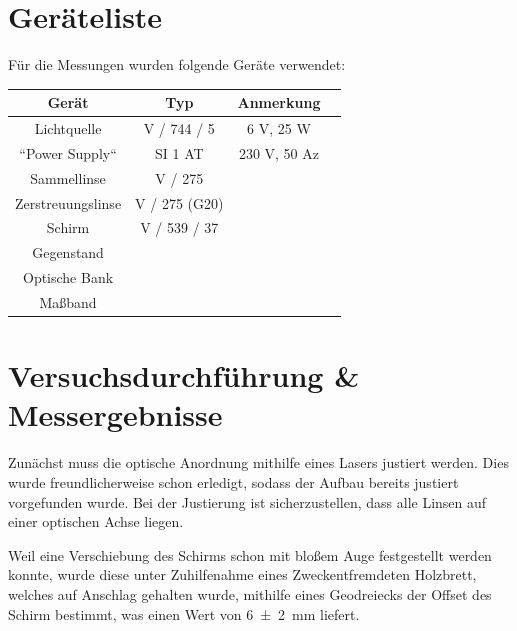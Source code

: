 \documentclass[11pt,ngerman]{scrartcl}
\begin{document}
\section{Geräteliste}

\noindent Für die Messungen wurden folgende Geräte verwendet:

\begin{center}
	\begin{tabular}{|c|c|c|c|} \hline
		\textbf{Gerät}    & \textbf{Typ}   & \textbf{Anmerkung} \\ \hline

		Lichtquelle       & V / 744 / 5    & 6 V, 25  W         \\ \hline
		``Power Supply``  & SI 1 AT        & 230 V, 50 Az       \\ \hline
		Sammellinse       & V / 275        &                    \\ \hline
		Zerstreuungslinse & V / 275  (G20) &                    \\ \hline
		Schirm            & V / 539 / 37   &                    \\ \hline
		Gegenstand        &                &                    \\ \hline
		Optische Bank     &                &                    \\ \hline
		Maßband           &                &                    \\ \hline
	\end{tabular}
\end{center}



\section{Versuchsdurchführung \& Messergebnisse}\label{sec:Versuchsdurchführung}

Zunächst muss die optische Anordnung mithilfe eines Lasers justiert werden. Dies wurde freundlicherweise schon erledigt, sodass der Aufbau bereits justiert vorgefunden wurde. Bei der Justierung ist sicherzustellen, dass alle Linsen auf einer optischen Achse liegen.

\vspace{2mm}

Weil eine Verschiebung des Schirms schon mit bloßem Auge festgestellt werden konnte, wurde diese unter Zuhilfenahme eines Zweckentfremdeten Holzbrett, welches auf Anschlag gehalten wurde, mithilfe eines Geodreiecks der Offset des Schirm bestimmt, was einen Wert von \SI{6(2)}{mm} liefert.
\end{document}
